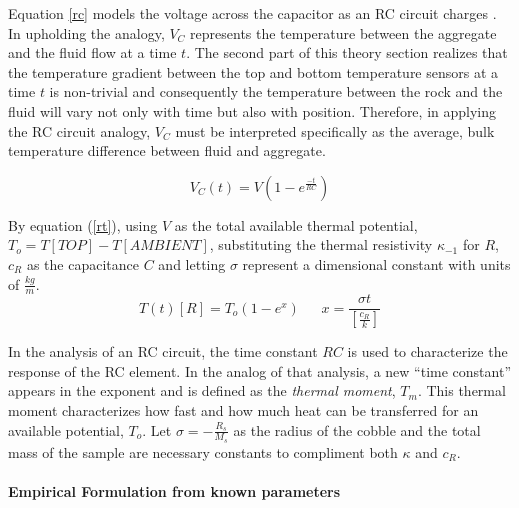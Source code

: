 Equation \ref{rc} models the voltage across the capacitor as an RC circuit charges \cite{elec}. In upholding the analogy, $V_{C}$ represents the temperature between the aggregate and the fluid flow at a time $t$. The second part of this theory section realizes that the temperature gradient between the top and bottom temperature sensors at a time $t$ is non-trivial and consequently the temperature between the rock and the fluid will vary not only with time but also with position. Therefore, in applying the RC circuit analogy, $V_{C}$ must be interpreted specifically as the average, bulk temperature difference between fluid and aggregate. 

\begin{equation}\label{rc}
 V_{C}(t)=V(1-e^{\frac{-t}{RC}})
\end{equation}

By equation (\ref{rt}), using $V$ as the total available thermal potential, $T_{o}=T[TOP]-T[AMBIENT]$, substituting the thermal resistivity $\kappa_{-1}$ for $R$, $c_{R}$ as the capacitance $C$ and letting $\sigma$ represent a dimensional constant with units of $\frac{kg}{m}$.
\begin{equation}\label{rcNew}
T(t)[R]=T_{o}(1-e^{x})\:\:\:\:\:\:\:x=\frac{\sigma t}{\left[\frac{c_{R}}{k}\right]}
\end{equation}

In the analysis of an RC circuit, the time constant $RC$ is used to characterize the response of the RC element. In the analog of that analysis, a new ``time constant'' appears in the exponent and is defined as the \emph{thermal moment}, $T_m$. This thermal moment characterizes how fast and how much heat can be transferred for an available potential, $T_{o}$. Let $\sigma=-\frac{R_{s}}{M_{s}}$ as the radius of the cobble and the total mass of the sample are necessary constants to compliment both $\kappa$ and $c_{R}$. 

\paragraph{Empirical Formulation from known parameters}

